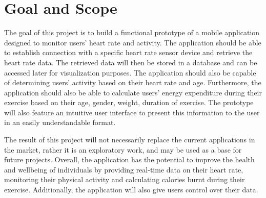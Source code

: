 \section{Goal and Scope}
The goal of this project is to build a functional prototype of a mobile application designed to monitor users' heart rate and activity.
The application should be able to establish connection with a specific heart rate sensor device and retrieve the heart rate data.
The retrieved data will then be stored in a database and can be accessed later for visualization purposes.
The application should also be capable of determining users' activity based on their heart rate and age.
Furthermore, the application should also be able to calculate users' energy expenditure during their exercise based on their age, gender, weight, duration of exercise.
The prototype will also feature an intuitive user interface to present this information to the user in an easily understandable format.

The result of this project will not necessarily replace the current applications in the market, rather it is an exploratory work, and may be used as a base for future projects.
Overall, the application has the potential to improve the health and wellbeing of individuals by providing real-time data on their heart rate, monitoring their physical activity and calculating calories burnt during their exercise. Additionally, the application will also give users control over their data.
